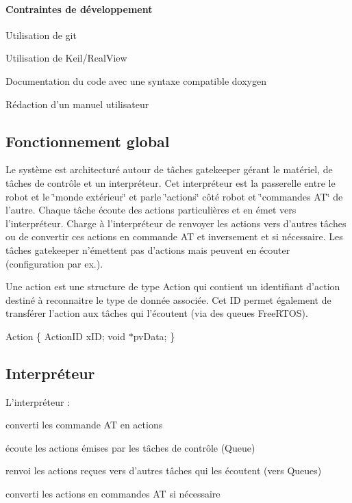 \paragraph*{Contraintes de développement}


\begin{DoxyItemize}
\item Utilisation de git
\item Utilisation de Keil/\-Real\-View
\item Documentation du code avec une syntaxe compatible doxygen
\item Rédaction d'un manuel utilisateur
\end{DoxyItemize}





\subsection*{Fonctionnement global}

Le système est architecturé autour de tâches gatekeeper gérant le matériel, de tâches de contrôle et un interpréteur. Cet interpréteur est la passerelle entre le robot et le \char`\"{}monde extérieur\char`\"{} et parle \char`\"{}actions\char`\"{} côté robot et \char`\"{}commandes A\-T\char`\"{} de l'autre. Chaque tâche écoute des actions particulières et en émet vers l'interpréteur. Charge à l'interpréteur de renvoyer les actions vers d'autres tâches ou de convertir ces actions en commande A\-T et inversement et si nécessaire. Les tâches gatekeeper n'émettent pas d'actions mais peuvent en écouter (configuration par ex.).

Une action est une structure de type Action qui contient un identifiant d'action destiné à reconnaitre le type de donnée associée. Cet I\-D permet également de transférer l'action aux tâches qui l'écoutent (via des queues Free\-R\-T\-O\-S).

Action \{ Action\-I\-D x\-I\-D; void $\ast$pv\-Data; \}

\subsection*{Interpréteur}

L'interpréteur \-:
\begin{DoxyItemize}
\item converti les commande A\-T en actions
\item écoute les actions émises par les tâches de contrôle (Queue)
\item renvoi les actions reçues vers d'autres tâches qui les écoutent (vers Queues)
\item converti les actions en commandes A\-T si nécessaire
\end{DoxyItemize}

